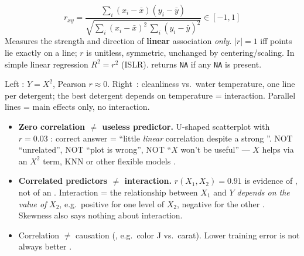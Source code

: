 \begin{keybox}
\[ r_{xy}=\frac{\sum_i (x_i-\bar x)(y_i-\bar y)}{\sqrt{\sum_i (x_i-\bar x)^2\,\sum_i (y_i-\bar y)^2}}\in[-1,1] \]
Measures the strength and direction of \textbf{linear} association \emph{only}. $|r|=1$ iff points lie exactly on a line; $r$ is unitless, symmetric, unchanged by centering/scaling. In simple linear regression $R^2=r^2$ (ISLR).  returns \texttt{NA} if any \texttt{NA} is present.
\end{keybox}

\begin{center}
\end{center}
{\footnotesize Left : $Y=X^2$, Pearson $r\approx0$. Right \,: cleanliness vs.\ water temperature, one line per detergent; the best detergent depends on temperature = interaction. Parallel lines = main effects only, no interaction.}

\begin{trap}
\begin{itemize}
\item \textbf{Zero correlation $\ne$ useless predictor.} U-shaped scatterplot with $r=0.03$ : correct answer = ``little \emph{linear} correlation despite a strong ''. NOT ``unrelated'', NOT ``plot is wrong'', NOT ``$X$ won't be useful'' --- $X$ helps via an $X^2$ term, KNN or other flexible models .
\item \textbf{Correlated predictors $\ne$ interaction.} $r(X_1,X_2)=0.91$ is evidence of , not of an . Interaction = the relationship between $X_1$ and $Y$ \emph{depends on the value of} $X_2$, e.g.\ positive for one level of $X_2$, negative for the other . Skewness also says nothing about interaction.
\item Correlation $\ne$ causation (, e.g.\ color J vs.\ carat). Lower training error is not always better .
\end{itemize}
\end{trap}

